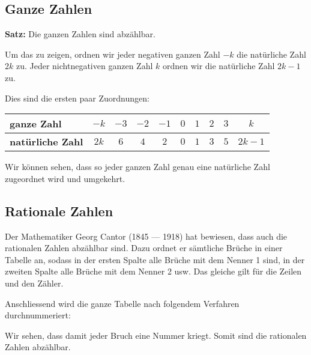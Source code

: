 \subsection{Ganze Zahlen}

\begin{theorem}
  \textbf{Satz:} Die ganzen Zahlen sind abzählbar.
\end{theorem}

Um das zu zeigen, ordnen wir jeder negativen ganzen Zahl $-k$ die natürliche Zahl $2k$ zu. Jeder nichtnegativen ganzen Zahl $k$ ordnen wir die natürliche Zahl $2k-1$ zu.

Dies sind die ersten paar Zuordnungen:
\begin{center}
  \renewcommand{\arraystretch}{1.3}
  \begin{tabularx}{\textwidth}{|l|C|C|C|C|C|C|C|C|C|}
  \hline
    \textbf{ganze Zahl}      & $-k$ & $-3$ & $-2$ & $-1$ & $0$ & $1$ & $2$ & $3$ & $k$ \\
  \hline
    \textbf{natürliche Zahl} & $2k$ &  $6$ & $4$ & $2$ & $0$ & $1$ & $3$ & $5$ & $2k-1$ \\
  \hline
  \end{tabularx}
\end{center}

Wir können sehen, dass so jeder ganzen Zahl genau eine natürliche Zahl zugeordnet wird und umgekehrt.

\subsection{Rationale Zahlen}

Der Mathematiker Georg Cantor (1845 — 1918) hat bewiesen, dass auch die rationalen Zahlen abzählbar sind. Dazu ordnet er sämtliche Brüche in einer Tabelle an, sodass in der ersten Spalte alle Brüche mit dem Nenner 1 sind, in der zweiten Spalte alle Brüche mit dem Nenner 2 usw. Das gleiche gilt für die Zeilen und den Zähler.

Anschliessend wird die ganze Tabelle nach folgendem Verfahren durchnummeriert:



Wir sehen, dass damit jeder Bruch eine Nummer kriegt. Somit sind die rationalen Zahlen abzählbar.
